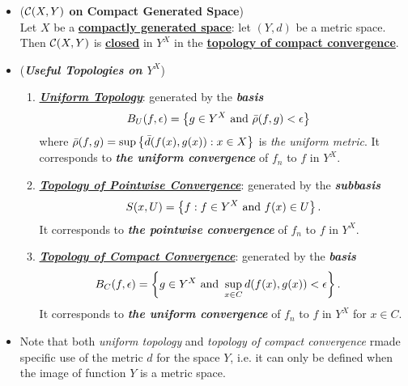 \documentclass[11pt]{article}
\begin{document}
\begin{itemize}
\item \begin{theorem} (\textbf{${\mathcal C}(X, Y)$ on Compact Generated Space})  \citep{munkres2000topology}\\
Let $X$ be a \underline{\textbf{compactly generated space}}: let $(Y, d)$ be a metric space. Then ${\mathcal C}(X, Y)$ is \underline{\textbf{closed}} in $Y^X$ in the \underline{\textbf{topology of compact convergence}}.
\end{theorem}

\item \begin{remark} (\emph{\textbf{Useful Topologies on $Y^X$}})
\begin{enumerate}
\item \underline{\emph{\textbf{Uniform Topology}}}: generated by the \emph{\textbf{basis}}
\begin{align*}
B_{U}(f, \epsilon) &= \left\{g \in Y^X\text{ and } \bar{\rho}(f, g) < \epsilon \right\}
\end{align*} where $\bar{\rho}(f, g) = \sup\left\{\bar{d}(f(x), g(x)): x \in X\right\}$ is \emph{the uniform metric}. It corresponds to \emph{\textbf{the uniform convergence}} of $f_n$ to $f$ in $Y^X$.

\item  \underline{\emph{\textbf{Topology of Pointwise Convergence}}}: generated by the \emph{\textbf{subbasis}}
\begin{align*}
S(x, U) = \left\{f:  f \in Y^X\text{ and }f(x) \in U\right\}.
\end{align*} It corresponds to \emph{\textbf{the pointwise convergence}} of $f_n$ to $f$ in $Y^X$.

\item \underline{\emph{\textbf{Topology of Compact Convergence}}}: generated by the \emph{\textbf{basis}}
\begin{align*}
B_{C}(f, \epsilon) &= \left\{g \in Y^X\text{ and } \sup_{x \in C}d(f (x), g(x)) < \epsilon \right\}.
\end{align*} It corresponds to \emph{\textbf{the uniform convergence}} of $f_n$ to $f$ in $Y^X$ for $x \in C$.
\end{enumerate}
\end{remark}

\item \begin{remark}
Note that both \emph{uniform topology} and \emph{topology of compact convergence} rmade specific use of the metric $d$ for the space $Y$, i.e. it can only be defined when the image of function $Y$  is a metric space.


\end{remark}
\end{itemize}
\end{document}
